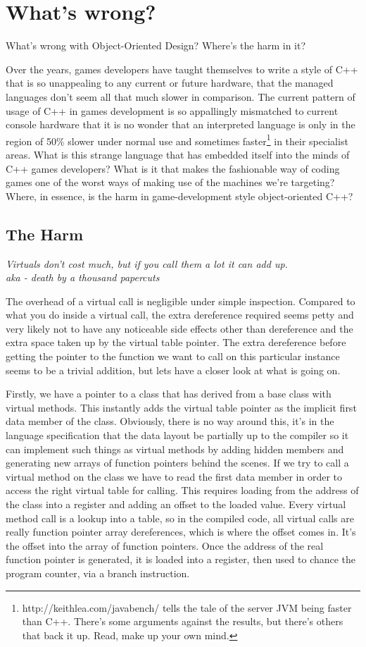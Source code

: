 \chapter{What's wrong?}\label{chap:harm} What's wrong with Object-Oriented
Design? Where's the harm in it?

Over the years, games developers have taught themselves to write a style of C++
that is so unappealing to any current or future hardware, that the managed
languages don't seem all that much slower in comparison. The current pattern of
usage of C++ in games development is so appallingly mismatched to current
console hardware that it is no wonder that an interpreted language is only in
the region of 50\% slower under normal use and sometimes
faster\footnote{http://keithlea.com/javabench/ tells the tale of the server JVM
being faster than C++. There's some arguments against the results, but there's
others that back it up. Read, make up your own mind.} in their specialist
areas. What is this strange language that has embedded itself into the minds of
C++ games developers? What is it that makes the fashionable way of coding games
one of the worst ways of making use of the machines we're targeting? Where, in
essence, is the harm in game-development style object-oriented C++?

\section{The Harm}
\emph{Virtuals don't cost much, but if you call them a lot it can add up.\\
aka - death by a thousand papercuts}

The overhead of a virtual call is negligible under simple inspection. Compared
to what you do inside a virtual call, the extra dereference required seems
petty and very likely not to have any noticeable side effects other than
dereference and the extra space taken up by the virtual table pointer. The
extra dereference before getting the pointer to the function we want to call on
this particular instance seems to be a trivial addition, but lets have a closer
look at what is going on.

Firstly, we have a pointer to a class that has derived from a base class with
virtual methods. This instantly adds the virtual table pointer as the implicit
first data member of the class. Obviously, there is no way around this, it's in
the language specification that the data layout be partially up to the compiler
so it can implement such things as virtual methods by adding hidden members and
generating new arrays of function pointers behind the scenes. If we try to call
a virtual method on the class we have to read the first data member in order to
access the right virtual table for calling. This requires loading from the
address of the class into a register and adding an offset to the loaded value.
Every virtual method call is a lookup into a table, so in the compiled code,
all virtual calls are really function pointer array dereferences, which is
where the offset comes in.  It's the offset into the array of function
pointers. Once the address of the real function pointer is generated, it is
loaded into a register, then used to chance the program counter, via a branch
instruction.

